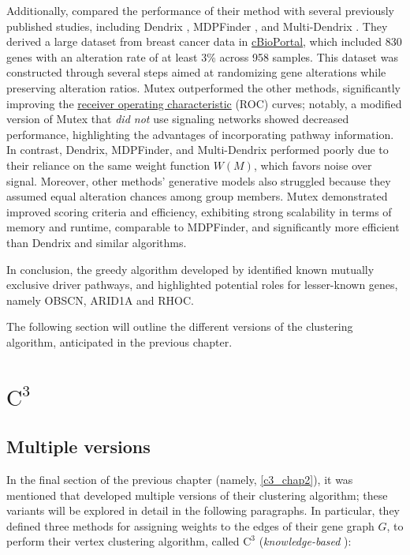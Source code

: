 Additionally, \textcite{mutex} compared the performance of their method with several previously published studies, including Dendrix \cite{dendrix}, MDPFinder \cite{mdpfinder}, and Multi-Dendrix \cite{multi-dendrix}. They derived a large dataset from breast cancer data in \href{https://www.cbioportal.org/}{cBioPortal}, which included 830 genes with an alteration rate of at least 3\% across 958 samples. This dataset was constructed through several steps aimed at randomizing gene alterations while preserving alteration ratios. Mutex outperformed the other methods, significantly improving the \href{https://en.wikipedia.org/wiki/Receiver_operating_characteristic}{receiver operating characteristic} (ROC) curves; notably, a modified version of Mutex that \textit{did not} use signaling networks showed decreased performance, highlighting the advantages of incorporating pathway information. In contrast, Dendrix, MDPFinder, and Multi-Dendrix performed poorly due to their reliance on the same weight function $W(M)$, which favors noise over signal. Moreover, other methods' generative models also struggled because they assumed equal alteration chances among group members. Mutex demonstrated improved scoring criteria and efficiency, exhibiting strong scalability in terms of memory and runtime, comparable to MDPFinder, and significantly more efficient than Dendrix and similar algorithms.

In conclusion, the greedy algorithm developed by \textcite{mutex} identified known mutually exclusive driver pathways, and highlighted potential roles for lesser-known genes, namely OBSCN, ARID1A and RHOC.

The following section will outline the different versions of the clustering algorithm, anticipated in the previous chapter.

\section{$\mathrm{C}^3$}

\subsection{Multiple versions}

In the final section of the previous chapter (namely, \cref{c3_chap2}), it was mentioned that \textcite{c3} developed multiple versions of their clustering algorithm; these variants will be explored in detail in the following paragraphs. In particular, they defined three methods for assigning weights to the edges of their gene graph $G$, to perform their vertex clustering algorithm, called $\mathrm{C}^3$ (\textit{knowledge-based} \cite{survey}):

